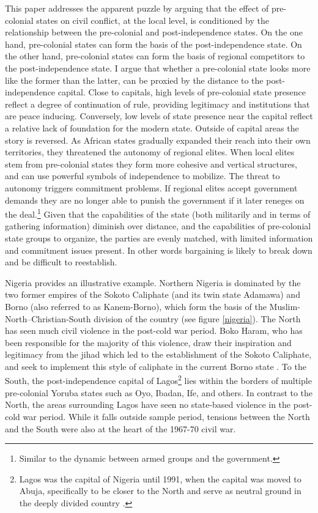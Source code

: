 This paper addresses the apparent puzzle by arguing that the effect of
pre-colonial states on civil conflict, at the local level, is conditioned by the
relationship between the pre-colonial and post-independence states. On the one
hand, pre-colonial states can form the basis of the post-independence state. On
the other hand, pre-colonial states can form the basis of regional competitors
to the post-independence state. I argue that whether a pre-colonial state looks
more like the former than the latter, can be proxied by the distance to the
post-independence capital. Close to capitals, high levels of pre-colonial state
presence reflect a degree of continuation of rule, providing legitimacy and
institutions that are peace inducing. Conversely, low levels of state presence
near the capital reflect a relative lack of foundation for the modern state.
Outside of capital areas the story is reversed. As African states gradually
expanded their reach into their own territories, they threatened the autonomy of
regional elites. When local elites stem from pre-colonial states they form more
cohesive and vertical structures, and can use powerful symbols of independence
to mobilize. The threat to autonomy triggers commitment problems. If regional
elites accept government demands they are no longer able to punish the
government if it later reneges on the deal.\footnote{Similar to the dynamic
between armed groups and the government.} Given that the capabilities of the
state (both militarily and in terms of gathering information) diminish over
distance, and the capabilities of pre-colonial state groups to organize, the
parties are evenly matched, with limited information and commitment issues
present. In other words bargaining is likely to break down and be difficult to
reestablish.

Nigeria provides an illustrative example. Northern Nigeria is dominated by the
two former empires of the Sokoto Caliphate (and its twin state Adamawa) and
Borno (also referred to as Kanem-Borno), which form the basis of the
Muslim-North--Christian-South division of the country (see figure
\ref{nigeria}). The North has seen much civil violence in the post-cold
war period. Boko Haram, who has been responsible for the majority of this
violence, draw their inspiration and legitimacy from the jihad which led to the
establishment of the Sokoto Caliphate, and seek to implement this style of
caliphate in the current Borno state \citep{Pieri2016}. To the South, the
post-independence capital of Lagos\footnote{Lagos was the capital of Nigeria
until 1991, when the capital was moved to Abuja, specifically to be closer to
the North and serve as neutral ground in the deeply divided country
\citep{Moore_1984}.} lies within the borders of multiple pre-colonial Yoruba
states such as Oyo, Ibadan, Ife, and others. In contrast to the North, the areas
surrounding Lagos have seen no state-based violence in the post-cold war period.
While it falls outside sample period, tensions between the North and the South
were also at the heart of the 1967-70 civil war.

